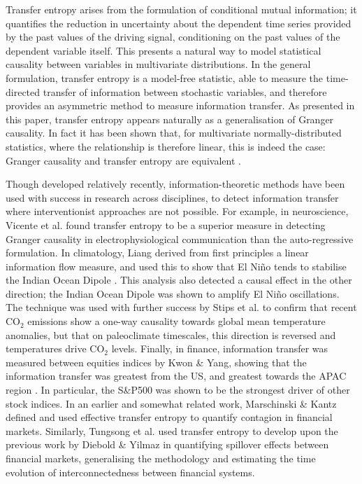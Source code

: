 \documentclass[]{rsos}%
\begin{document}
  Transfer entropy arises from the formulation of conditional mutual information; it quantifies the reduction in uncertainty about the dependent time series provided by the past values of the driving signal, conditioning on the past values of the dependent variable itself. This presents a natural way to model statistical causality between variables in multivariate distributions. In the general formulation, transfer entropy is a model-free statistic, able to measure the time-directed transfer of information between stochastic variables, and therefore provides an asymmetric method to measure information transfer. As presented in this paper, transfer entropy appears naturally as a generalisation of Granger causality. In fact it has been shown that, for multivariate normally-distributed statistics, where the relationship is therefore linear, this is indeed the case: Granger causality and transfer entropy are equivalent \cite{barnett2009granger}.

  Though developed relatively recently, information-theoretic methods have been used with success in research across disciplines, to detect information transfer where interventionist approaches are not possible. For example, in neuroscience, Vicente et al. \cite{vicente2011transfer} found transfer entropy to be a superior measure in {\color{blue} detecting Granger causality} in electrophysiological communication than {\color{blue}the auto-regressive formulation}. In climatology, Liang derived from first principles a linear information flow measure, and used this to show that El Ni\~{n}o tends to stabilise the Indian Ocean Dipole \cite{san2014unraveling}. This analysis also detected a causal effect in the other direction; the Indian Ocean Dipole was shown to amplify El Ni\~{n}o oscillations. The technique was used with further success by Stips et al. \cite{stips2016causal} to confirm that recent CO$_2$ emissions show a one-way causality towards global mean temperature anomalies, but that on paleoclimate timescales, this direction is reversed and temperatures drive CO$_2$ levels. Finally, in finance, information transfer was measured between equities indices by Kwon \& Yang, showing that the information transfer was greatest from the US, and greatest towards the APAC region \cite{kwon2008information}. In particular, the S\&P500 was shown to be the strongest driver of other stock indices. In an earlier and somewhat related work, Marschinski \& Kantz   \cite{Marschinski2002} defined and used effective transfer entropy to quantify contagion in financial markets. Similarly, Tungsong et al. \cite{tungsong2018} used transfer entropy to develop upon the previous work by Diebold \& Yilmaz \cite{diebold2009measuring} in quantifying spillover effects between financial markets, generalising the methodology and estimating the time evolution of interconnectedness between financial systems.
\end{document}
